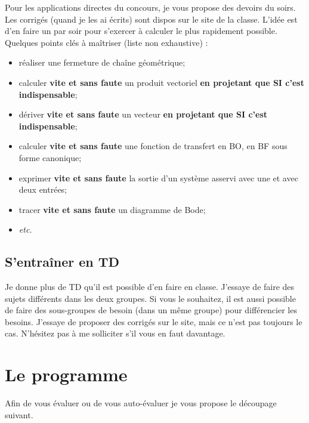 Pour les applications directes du concours, je vous propose des devoirs du soirs. Les corrigés (quand je les ai écrits) sont dispos sur le site de la classe. L'idée est d'en faire un par soir pour s'exercer à calculer le plus rapidement possible. Quelques points clés à maîtriser (liste non exhaustive) : 
\begin{itemize}
\item réaliser une fermeture de chaîne géométrique;
\item calculer \textbf{vite et sans faute} un produit vectoriel \textbf{en projetant que SI c'est indispensable};
\item dériver \textbf{vite et sans faute} un vecteur \textbf{en projetant que SI c'est indispensable};
\item calculer \textbf{vite et sans faute} une fonction de transfert en BO, en BF sous forme canonique;
\item exprimer \textbf{vite et sans faute} la sortie d'un système asservi avec une et avec deux entrées;
\item tracer \textbf{vite et sans faute} un diagramme de Bode;
\item \textit{etc.}
\end{itemize}

\subsection{S'entraîner en TD}
Je donne plus de TD qu'il est possible d'en faire en classe. J'essaye de faire des sujets différents dans les deux groupes. Si vous le souhaitez, il est aussi possible de faire des sous-groupes de besoin (dans un même groupe) pour différencier les besoins.
J'essaye de proposer des corrigés sur le site, mais ce n'est pas toujours le cas. N'hésitez pas à me solliciter s'il vous en faut davantage. 



\section{Le programme}

Afin de vous évaluer ou de vous auto-évaluer je vous propose le découpage suivant.

\begin{multicols}{2}
\allCompWideMP
\end{multicols}